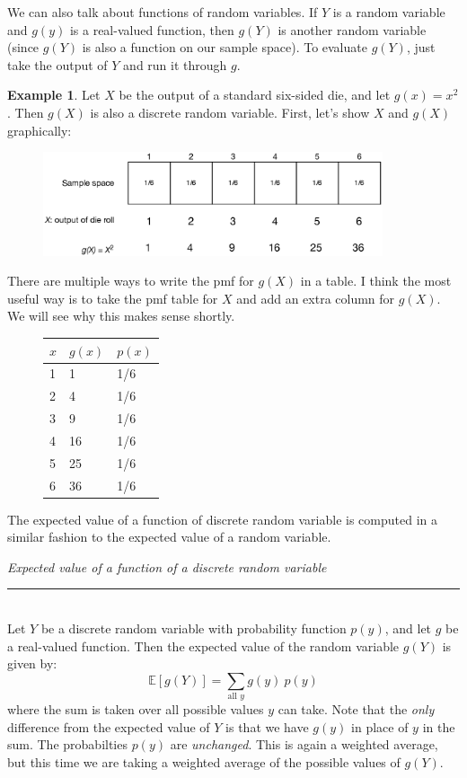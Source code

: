 \documentclass[12pt]{article}
\theoremstyle{definition}
\newtheorem*{example}{Example}
\theoremstyle{remark}
\def\E{{\mathbb E}}
\begin{document}

We can also talk about functions of random variables. If $Y$ is a random variable and $g(y)$ is a real-valued function, then $g(Y)$ is another random variable (since $g(Y)$ is also a function on our sample space). To evaluate $g(Y)$, just take the output of $Y$ and run it through $g$. 

\begin{example}
Let $X$ be the output of a standard six-sided die, and let $g(x) = x^2$. Then $g(X)$ is also a discrete random variable. First, let's show $X$ and $g(X)$ graphically:
\begin{figure}[H]
\centering
\includegraphics[width=10cm]{1diesquared}
\end{figure}
There are multiple ways to write the pmf for $g(X)$ in a table. I think the most useful way is to take the pmf table for $X$ and add an extra column for $g(X)$. We will see why this makes sense shortly.
\begin{figure}[H]
\centering
\begin{tabular}{l@{\hskip 2cm}l@{\hskip 2cm}l}
\toprule
$x$ & $g(x)$ & $p(x)$\\
\midrule
1 & 1 & 1/6\\
2 & 4 & 1/6\\
3 & 9 & 1/6\\
4 & 16 & 1/6\\
5 & 25 & 1/6\\
6 & 36 & 1/6\\
\bottomrule
\end{tabular}
\end{figure}

\end{example}

The expected value of a function of discrete random variable is computed in a similar fashion to the expected value of a random variable.

\begin{framed}
  \emph{Expected value of a function of a discrete random variable}\\
  \rule{\dimexpr{}\fboxrule}{.1pt} \\
Let $Y$ be a discrete random variable with probability function $p(y)$, and let $g$ be a real-valued function. Then the expected value of the random variable $g(Y)$ is given by:
\[
\E[g(Y)] = \sum_{\text{all }y}g(y)\:p(y)
\]
where the sum is taken over all possible values $y$ can take. Note that the \emph{only} difference from the expected value of $Y$ is that we have $g(y)$ in place of $y$ in the sum. The probabilties $p(y)$ are \emph{unchanged}. This is again a weighted average, but this time we are taking a weighted average of the possible values of $g(Y)$.
\end{framed}
\end{document}
